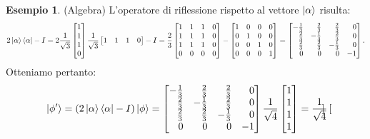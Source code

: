 \documentclass{book}
\theoremstyle{definition}
\theoremstyle{definition}
\theoremstyle{definition}
\newtheorem*{ex}{Esempio}
\theoremstyle{plain}
\theoremstyle{plain}
\theoremstyle{plain}
\theoremstyle{plain}
\begin{document}
\begin{ex}
(Algebra) L'operatore di riflessione rispetto al vettore $\ket{\alpha}$ risulta:
\begin{displaymath}
2\ket{\alpha}\bra{\alpha} - I = 2 \frac{1}{\sqrt{3}}\begin{bmatrix}
1 \\
1 \\
1 \\
0
\end{bmatrix}
\frac{1}{\sqrt{3}} \begin{bmatrix}
1 & 1 & 1 & 0 \\
\end{bmatrix}
- I = \frac{2}{3} \begin{bmatrix}
1 & 1 & 1 & 0 \\
1 & 1 & 1 & 0 \\
1 & 1 & 1 & 0 \\
0 & 0 & 0 & 0 
\end{bmatrix}
- \begin{bmatrix}
1 & 0 & 0 & 0 \\
0 & 1 & 0 & 0 \\
0 & 0 & 1 & 0 \\
0 & 0 & 0 & 1 \\
\end{bmatrix} = \begin{bmatrix*}[r]
-\frac{1}{3} & \frac{2}{3} & \frac{2}{3} & 0 \\
\frac{2}{3} & -\frac{1}{3} & \frac{2}{3} & 0 \\
\frac{2}{3} & \frac{2}{3} & -\frac{1}{3} & 0 \\
0 & 0 & 0 & -1
\end{bmatrix*}.
\end{displaymath}
Otteniamo pertanto:
\begin{displaymath}
\ket{\phi'} = (2\ket{\alpha}\bra{\alpha}-I) \ket{\phi} = \begin{bmatrix*}[r]
-\frac{1}{3} & \frac{2}{3} & \frac{2}{3} & 0 \\
\frac{2}{3} & -\frac{1}{3} & \frac{2}{3} & 0 \\
\frac{2}{3} & \frac{2}{3} & -\frac{1}{3} & 0 \\
0 & 0 & 0 & -1
\end{bmatrix*}
\frac{1}{\sqrt{4}}
\begin{bmatrix}
1 \\
1 \\
1 \\
1
\end{bmatrix}
= 
\frac{1}{\sqrt{4}} \begin{bmatrix*}[r]

\end{bmatrix*}
\end{displaymath}
\end{ex}
\end{document}
